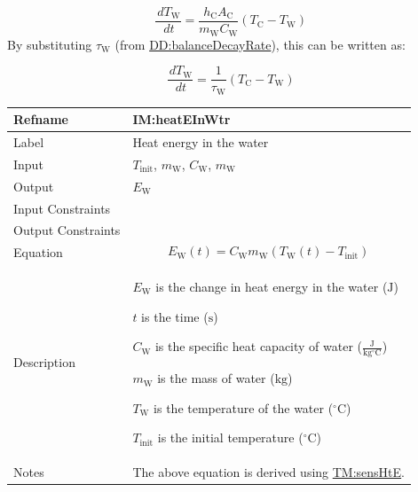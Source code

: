 \documentclass[12pt]{article}
\begin{document}
\begin{displaymath}
\frac{\,d{T_{\text{W}}}}{\,dt}=\frac{{h_{\text{C}}} {A_{\text{C}}}}{{m_{\text{W}}} {C_{\text{W}}}} \left({T_{\text{C}}}-{T_{\text{W}}}\right)
\end{displaymath}
By substituting ${τ_{\text{W}}}$ (from \hyperref[DD:balanceDecayRate]{DD:balanceDecayRate}), this can be written as:

\begin{displaymath}
\frac{\,d{T_{\text{W}}}}{\,dt}=\frac{1}{{τ_{\text{W}}}} \left({T_{\text{C}}}-{T_{\text{W}}}\right)
\end{displaymath}
\vspace{\baselineskip}
\noindent
\begin{minipage}{\textwidth}
\begin{tabular}{>{\raggedright}p{}>{\raggedright\arraybackslash}p{}}
\toprule \textbf{Refname} & \textbf{IM:heatEInWtr}
\label{IM:heatEInWtr}
\\ \midrule
Label & Heat energy in the water
        
\\ \midrule
Input & ${T_{\text{init}}}$, ${m_{\text{W}}}$, ${C_{\text{W}}}$, ${m_{\text{W}}}$
        
\\ \midrule
Output & ${E_{\text{W}}}$
         
\\ \midrule
Input Constraints & 
\\ \midrule
Output Constraints & 
\\ \midrule
Equation & \begin{displaymath}
           {E_{\text{W}}}\left(t\right)={C_{\text{W}}} {m_{\text{W}}} \left({T_{\text{W}}}\left(t\right)-{T_{\text{init}}}\right)
           \end{displaymath}
\\ \midrule
Description & \begin{symbDescription}
              \item{${E_{\text{W}}}$ is the change in heat energy in the water (${\text{J}}$)}
              \item{$t$ is the time (${\text{s}}$)}
              \item{${C_{\text{W}}}$ is the specific heat capacity of water ($\frac{\text{J}}{\text{kg}{}^{\circ}\text{C}}$)}
              \item{${m_{\text{W}}}$ is the mass of water (${\text{kg}}$)}
              \item{${T_{\text{W}}}$ is the temperature of the water (${{}^{\circ}\text{C}}$)}
              \item{${T_{\text{init}}}$ is the initial temperature (${{}^{\circ}\text{C}}$)}
              \end{symbDescription}
\\ \midrule
Notes & The above equation is derived using \hyperref[TM:sensHtE]{TM:sensHtE}.
        

\end{tabular}
\end{minipage}
\end{document}
